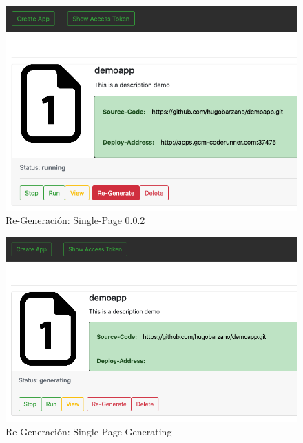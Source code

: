 \documentclass[a4paper,11pt]{book}
\begin{document}
 \begin{figure}[H]
\centering
\includegraphics[scale=0.4]{imagenes/casouso_a/4_1.png}
\caption{  Re-Generación: Single-Page 0.0.2 }
\label{4_1}
\end{figure}


\begin{figure}[H]
\centering
\includegraphics[scale=0.4]{imagenes/casouso_a/4_3.png}
\caption{ Re-Generación: Single-Page Generating  }
\label{4_3}
\end{figure}
\end{document}
